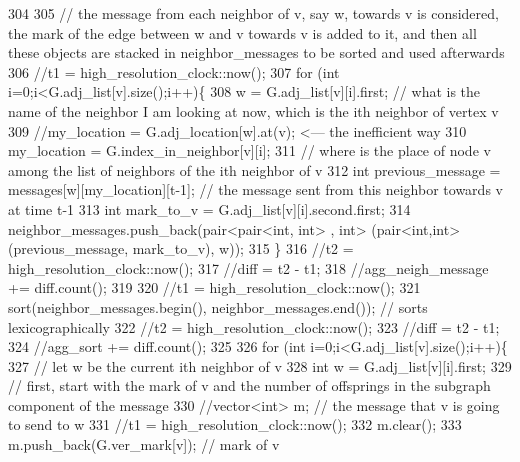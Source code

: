 \begin{DoxyCode}
304 \textcolor{comment}{}
305 \textcolor{comment}{        // the message from each neighbor of v, say w,  towards v is considered, the mark of the edge
       between w and v towards v is added to it, and then all these objects are stacked in neighbor\_messages to be
       sorted and used afterwards}
306 \textcolor{comment}{        //t1 = high\_resolution\_clock::now();}
307 \textcolor{comment}{        for (int i=0;i<G.adj\_list[v].size();i++)\{}
308 \textcolor{comment}{          w = G.adj\_list[v][i].first; // what is the name of the neighbor I am looking at now, which is the
       ith neighbor of vertex v }
309 \textcolor{comment}{          //my\_location = G.adj\_location[w].at(v); <--- the inefficient way}
310 \textcolor{comment}{          my\_location = G.index\_in\_neighbor[v][i];}
311 \textcolor{comment}{          // where is the place of node v among the list of neighbors of the ith neighbor of v}
312 \textcolor{comment}{          int previous\_message = messages[w][my\_location][t-1]; // the message sent from this neighbor
       towards v at time t-1}
313 \textcolor{comment}{          int mark\_to\_v = G.adj\_list[v][i].second.first;}
314 \textcolor{comment}{          neighbor\_messages.push\_back(pair<pair<int, int> , int> (pair<int,int>(previous\_message,
       mark\_to\_v), w));}
315 \textcolor{comment}{        \}}
316 \textcolor{comment}{        //t2 = high\_resolution\_clock::now();}
317 \textcolor{comment}{        //diff = t2 - t1;}
318 \textcolor{comment}{        //agg\_neigh\_message += diff.count();}
319 \textcolor{comment}{}
320 \textcolor{comment}{        //t1 = high\_resolution\_clock::now();}
321 \textcolor{comment}{        sort(neighbor\_messages.begin(), neighbor\_messages.end()); // sorts lexicographically}
322 \textcolor{comment}{        //t2 = high\_resolution\_clock::now();}
323 \textcolor{comment}{        //diff = t2 - t1;}
324 \textcolor{comment}{        //agg\_sort += diff.count();}
325 \textcolor{comment}{}
326 \textcolor{comment}{        for (int i=0;i<G.adj\_list[v].size();i++)\{}
327 \textcolor{comment}{          // let w be the current ith neighbor of v}
328 \textcolor{comment}{          int w = G.adj\_list[v][i].first;}
329 \textcolor{comment}{          // first, start with the mark of v and the number of offsprings in the subgraph component of the
       message}
330 \textcolor{comment}{          //vector<int> m; // the message that v is going to send to w}
331 \textcolor{comment}{          //t1 = high\_resolution\_clock::now();}
332 \textcolor{comment}{          m.clear();}
333 \textcolor{comment}{          m.push\_back(G.ver\_mark[v]); // mark of v}

\end{DoxyCode}
